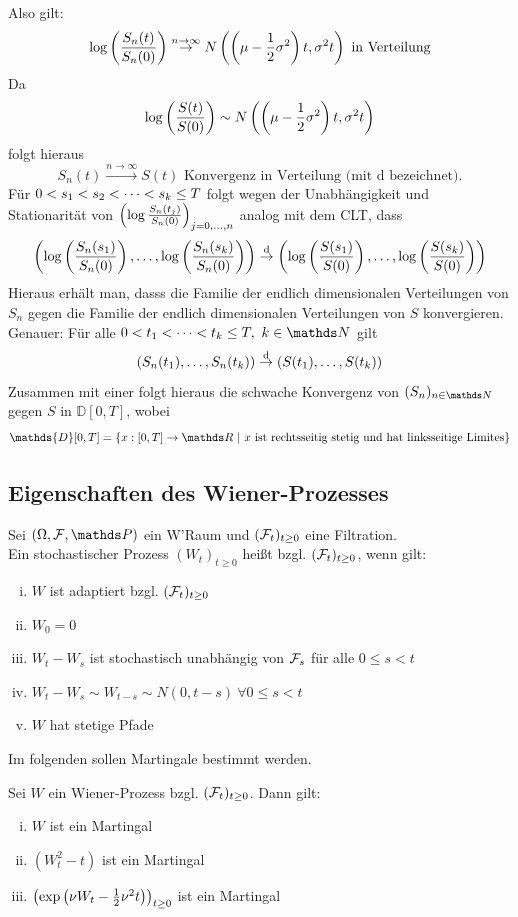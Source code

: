 Also gilt:
\[
\log\left( \frac{S_n(t)}{S_n(0)}\right)\stackrel{n\to\infty}{\to} N\left( \left( \mu-\frac{1}{2}\sigma^2\right)t,\sigma^2t\right)\text{ in Verteilung}
\]
Da 
\[
\log\left( \frac{S(t)}{S(0)}\right)\sim N\left( \left( \mu-\frac{1}{2}\sigma^2\right)t,\sigma^2t\right)
\]
folgt hieraus
\[
S_n(t)\stackrel{n\to\infty}{\to}S(t)\text{ Konvergenz in Verteilung (mit d bezeichnet).}
\]
Für $0<s_1<s_2< \dots <s_k\le T$ folgt wegen der Unabhängigkeit und Stationarität von $\left( \log\frac{S_n(t_j)}{S_n(0)}\right)_{j=0, \dots ,n}$ analog mit dem CLT, dass
\[
\left( \log\left( \frac{S_n(s_1)}{S_n(0)}\right), \dots ,\log\left( \frac{S_n(s_k)}{S_n(0)}\right)\right)\stackrel{\text{d}}{\to}\left( \log\left( \frac{S(s_1)}{S(0)}\right), \dots ,\log\left( \frac{S(s_k)}{S(0)}\right)\right)
\]
Hieraus erhält man, dasss die Familie der endlich dimensionalen Verteilungen von $S_n$ gegen die Familie der endlich dimensionalen Verteilungen von $S$ konvergieren.
Genauer: Für alle $0<t_1\dt{<}t_k\le T,~k\in \N$ gilt
\[
\left( S_n(t_1), \dots ,S_n(t_k)\right)\stackrel{\text{d}}{\to}\left( S(t_1), \dots ,S(t_k)\right)
\]
Zusammen mit einer  folgt hieraus die schwache Konvergenz von $(S_n)_{n\in \N}$ gegen $S$ in $\mathds{D}[0,T]$, wobei
\[
\mathds{D}[0,T]=\penbrace{x:[0,T]\to\R~|~x \text{ ist rechtsseitig stetig und hat linksseitige Limites}}
\]

\subsection{Eigenschaften des Wiener-Prozesses}
\label{sub:eig_weiner-prozess}
Sei $(\Omega,\F,\Pw)$ ein W'Raum und $(\mathcal{F}_t)_{t\ge0}$ eine Filtration.\\
Ein stochastischer Prozess $(W_t)_{t\ge0}$ heißt  bzgl. $(\mathcal{F}_t)_{t\ge0}$, wenn gilt:
\begin{enumerate}[(i)]
	\item $W$ ist adaptiert bzgl. $(\mathcal{F}_t)_{t\ge0}$
	\item $W_0=0$ \Pfs
	\item $W_t-W_s$ ist stochastisch unabhängig von $\mathcal{F}_s$ für alle $0\le s<t$
	\item $W_t-W_s\sim W_{t-s}\sim N(0,t-s)~\forall 0\le s<t$
	\item $W$ hat \Pfs stetige Pfade
\end{enumerate}
Im folgenden sollen Martingale bestimmt werden.

Sei $W$ ein Wiener-Prozess bzgl. $(\mathcal{F}_t)_{t\ge0}$.
Dann gilt:
\begin{enumerate}[(i)]
	\item $W$ ist ein Martingal
	\item $(W_t^2-t)$ ist ein Martingal
	\item $\left( \exp\left( \nu W_t-\frac{1}{2}\nu^2 t\right)\right)_{t\ge 0}$ ist ein Martingal
\end{enumerate}


